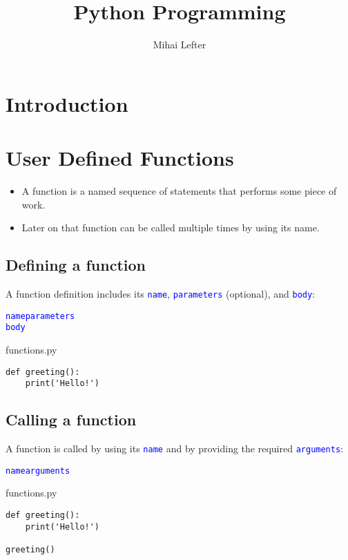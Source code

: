 \documentclass[aspectratio=1610,slidestop]{beamer}
\author{Mihai Lefter}
\title{Python Programming}
\newcommand{\decl}[1]{\textcolor{blue}{\lstinline{#1}}}
\begin{document}

\makeTitleSlide{}


\section{Introduction}
\makeTableOfContents


\section{User Defined Functions}

\begin{pframe}
 \begin{itemize}
  \item A function is a named sequence of statements that performs some piece
        of work.
  \item Later on that function can be called multiple times by using its name.
 \end{itemize}
\end{pframe}


\subsection{Defining a function}
\begin{pframe}
 A function definition includes its \decl{name}, \decl{parameters} (optional), and \decl{body}:
 \begin{pythondeclaration}
  \textvisiblespace\decl{name}\emp{(}\decl{parameters}\emp{):}\\
  \textvisiblespace\textvisiblespace\textvisiblespace\textvisiblespace\decl{body}
 \end{pythondeclaration}
 \pause
 \begin{pythonfile}{functions.py}
  \begin{verbatim}
def greeting():
    print('Hello!')
  \end{verbatim}
 \end{pythonfile}
\end{pframe}


\subsection{Calling a function}
\begin{pframe}
 A function is called by using its \decl{name} and by providing the required
 \decl{arguments}:
 \begin{pythondeclaration}
  \decl{name}\emp{(}\decl{arguments}\emp{)}
 \end{pythondeclaration}
 \pause
 \begin{pythonfile}{functions.py}
  \begin{verbatim}
def greeting():
    print('Hello!')

greeting()
  \end{verbatim}
 \end{pythonfile}
\end{pframe}
\end{document}
